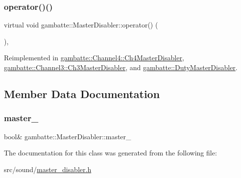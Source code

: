 \subsubsection{\texorpdfstring{operator()()}{operator()()}}
{\footnotesize\ttfamily virtual void gambatte\+::\+Master\+Disabler\+::operator() (\begin{DoxyParamCaption}{ }\end{DoxyParamCaption})\hspace{0.3cm}{\ttfamily [inline]}, {\ttfamily [virtual]}}



Reimplemented in \hyperlink{classgambatte_1_1Channel4_1_1Ch4MasterDisabler_a7f9ddd23602b991df7ee5bb2a734cc99}{gambatte\+::\+Channel4\+::\+Ch4\+Master\+Disabler}, \hyperlink{classgambatte_1_1Channel3_1_1Ch3MasterDisabler_aa8b79b7238fc3249d6a5bb0d64aa43d1}{gambatte\+::\+Channel3\+::\+Ch3\+Master\+Disabler}, and \hyperlink{classgambatte_1_1DutyMasterDisabler_a21f513f0b20eae19255a473668a099f6}{gambatte\+::\+Duty\+Master\+Disabler}.



\subsection{Member Data Documentation}
\mbox{\label{classgambatte_1_1MasterDisabler_ae2cb1d8720294d0f32eba06d93483a06}} 
\subsubsection{\texorpdfstring{master\+\_\+}{master\_}}
{\footnotesize\ttfamily bool\& gambatte\+::\+Master\+Disabler\+::master\+\_\+\hspace{0.3cm}{\ttfamily [private]}}



The documentation for this class was generated from the following file\+:\begin{DoxyCompactItemize}
\item 
src/sound/\hyperlink{master__disabler_8h}{master\+\_\+disabler.\+h}\end{DoxyCompactItemize}
